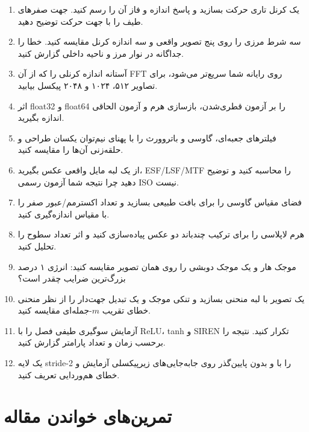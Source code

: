 \documentclass[12pt,openany,oneside]{book}
\begin{document}
\begin{enumerate}
\item یک کرنل تاری حرکت بسازید و پاسخ اندازه و فاز آن را رسم کنید. جهت صفرهای طیف را با جهت حرکت توضیح دهید.
\item سه شرط مرزی را روی پنج تصویر واقعی و سه اندازه کرنل مقایسه کنید. خطا را جداگانه در نوار مرز و ناحیه
داخلی گزارش کنید.
\item آستانه اندازه کرنلی را که از آن FFT روی رایانه شما سریع‌تر می‌شود، برای تصاویر ۵۱۲، ۱۰۲۴ و ۲۰۴۸
پیکسل بیابید.
\item اثر float32 و float64 را بر آزمون قطری‌شدن، بازسازی هرم و آزمون الحاقی اندازه بگیرید.
\item فیلترهای جعبه‌ای، گاوسی و باتروورث را با پهنای نیم‌توان یکسان طراحی و حلقه‌زنی آن‌ها را مقایسه کنید.
\item از یک لبه مایل واقعی عکس بگیرید، ESF/LSF/MTF را محاسبه کنید و توضیح دهید چرا نتیجه شما آزمون رسمی
ISO نیست.
\item فضای مقیاس گاوسی را برای بافت طبیعی بسازید و تعداد اکسترمم/عبور صفر را با مقیاس اندازه‌گیری کنید.
\item هرم لاپلاسی را برای ترکیب چندباند دو عکس پیاده‌سازی کنید و اثر تعداد سطوح را تحلیل کنید.
\item موجک هار و یک موجک دوبشی را روی همان تصویر مقایسه کنید: انرژی ۱ درصد بزرگ‌ترین ضرایب چقدر است؟
\item یک تصویر با لبه منحنی بسازید و تنکی موجک و یک تبدیل جهت‌دار را از نظر منحنی خطای تقریب \(m\)-جمله‌ای
مقایسه کنید.
\item آزمایش سوگیری طیفی فصل را با ReLU، tanh و SIREN تکرار کنید. نتیجه را برحسب زمان و تعداد پارامتر گزارش کنید.
\item یک لایه stride-2 را با و بدون پایین‌گذر روی جابه‌جایی‌های زیرپیکسلی آزمایش و خطای هم‌وردایی تعریف کنید.
\end{enumerate}

\section{تمرین‌های خواندن مقاله}
\end{document}
